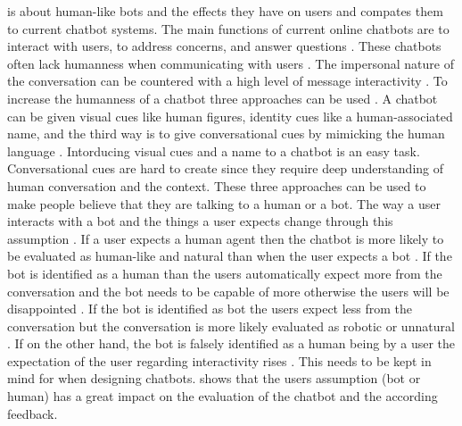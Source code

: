 \citet{GO2019304} is about human-like bots and the 
effects they have on users and compates them to current chatbot systems.
The main functions of  current online chatbots are to interact with users, to address concerns, and answer questions \cite{GO2019304}.
These chatbots often lack humanness when communicating with users \citet{GO2019304}.
The impersonal nature of the conversation can be countered with a high level of message interactivity \cite{GO2019304}.
To increase the humanness of a chatbot three approaches can be used \cite{GO2019304}.
A chatbot can be given visual cues like human figures, identity cues like a human-associated name, and the third way is to 
give conversational cues by mimicking the human language \cite{GO2019304}.
Intorducing visual cues and a name to a chatbot is an easy task.
Conversational cues are hard to create since they require deep
understanding of human conversation and the context.
These three approaches can be used to make people believe that they are talking to a human or a bot.
The way a user interacts with a bot and the things a user expects change through this assumption \cite{sundar2016theoretical, GO2019304}.
If a user expects a human agent then the chatbot is more likely to be evaluated as human-like and natural 
than when the user expects a bot \cite{sundar2016theoretical}.
If the bot is identified as a human than the users automatically expect more from the conversation and the 
bot needs to be capable of more otherwise the users will be disappointed \citet{GO2019304}.
If the bot is identified as bot the users expect less from the conversation but the conversation 
is more likely evaluated as robotic or unnatural \cite{GO2019304}.
If on the other hand, the bot is falsely identified as a human being by a user the expectation of the user regarding 
interactivity rises \cite{GO2019304}.
This needs to be kept in mind for when designing chatbots.
\citet{GO2019304} shows that the users assumption (bot or human) has a great impact on the evaluation of 
the chatbot and the according feedback.

